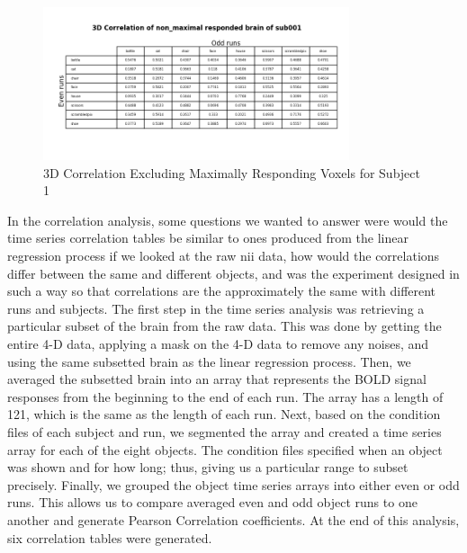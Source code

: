 \documentclass[11pt,twocolumn]{article}
\begin{document}
\begin{figure}[h!]                                                              
\centering                                                                      
\includegraphics[width=90mm]{3d_non_max_correlation_table_sub001.png}                   
\caption{3D Correlation Excluding Maximally Responding Voxels for Subject 1}                                    
\end{figure}

In the correlation analysis, some questions we wanted to answer were
would the time series correlation tables be similar to ones produced from
the linear regression process if we looked at the raw nii data, how would
the correlations differ between the same and different objects, and was the
experiment designed in such a way so that correlations are the approximately
the same with different runs and subjects. The first step in the time series
analysis was retrieving a particular subset of the brain from the raw data.
This was done by getting the entire 4-D data, applying a mask on the 4-D data
to remove any noises, and using the same subsetted brain as the linear
regression process. Then, we averaged the subsetted brain into an array that
represents the BOLD signal responses from the beginning to the end of each run.
The array has a length of 121, which is the same as the length of each run.
Next, based on the condition files of each subject and run, we segmented the
array and created a time series array for each of the eight objects. The
condition files specified when an object was shown and for how long; thus,
giving us a particular range to subset precisely. Finally, we grouped the
object time series arrays into either even or odd runs. This allows us to
compare averaged even and odd object runs to one another and generate
Pearson Correlation coefficients. At the end of this analysis, six correlation
tables were generated.
\end{document}
